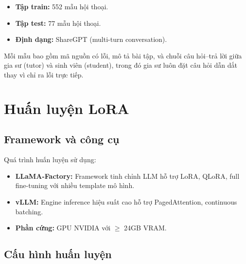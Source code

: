 \begin{itemize}
    \item \textbf{Tập train:} 552 mẫu hội thoại.
    \item \textbf{Tập test:} 77 mẫu hội thoại.
    \item \textbf{Định dạng:} ShareGPT (multi-turn conversation).
\end{itemize}

Mỗi mẫu bao gồm mã nguồn có lỗi, mô tả bài tập, và chuỗi câu hỏi--trả lời giữa gia sư (tutor) và sinh viên (student), trong đó gia sư luôn đặt câu hỏi dẫn dắt thay vì chỉ ra lỗi trực tiếp.

\section{Huấn luyện LoRA}

\subsection{Framework và công cụ}

Quá trình huấn luyện sử dụng:
\begin{itemize}
    \item \textbf{LLaMA-Factory:} Framework tinh chỉnh LLM hỗ trợ LoRA, QLoRA, full fine-tuning với nhiều template mô hình.
    \item \textbf{vLLM:} Engine inference hiệu suất cao hỗ trợ PagedAttention, continuous batching.
    \item \textbf{Phần cứng:} GPU NVIDIA với $\geq$ 24GB VRAM.
\end{itemize}

\subsection{Cấu hình huấn luyện}

\begin{table}[h]
\centering
\renewcommand{\arraystretch}{1.3}
\caption{Siêu tham số huấn luyện cho các mô hình}
\label{tab:hyperparams}
\end{table}

